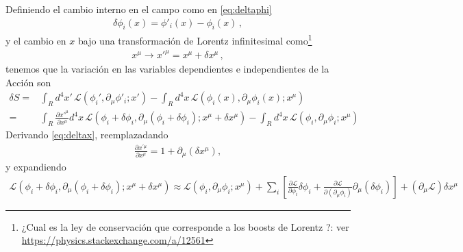 \begin{frame}
Definiendo el cambio interno en el campo como en \eqref{eq:deltaphi}
\begin{align}
  \delta\phi_i(x)=\phi'_i(x)-\phi_i(x)\,,
\end{align}
y el cambio en $x$ bajo una transformación de Lorentz infinitesimal como\footnote{¿Cual es la ley de conservación que corresponde a los boosts de Lorentz ?: ver \url{https://physics.stackexchange.com/a/12561}}
\begin{align}
\label{eq:deltax}
  x^\mu\to {x'}^\mu=x^\mu+\delta x^\mu\,,
\end{align}
tenemos que la variación en las variables dependientes e independientes de la Acción son
\begin{align}
   \delta S=&\int_{R}d^4x'\,\mathcal{L} \left( \phi_{i}',\partial_{\mu}\phi'_i;x' \right)- \int_{R}d^4x\,\mathcal{L} \left( \phi_{i}(x),\partial_{\mu}\phi_i(x);x^\mu \right) \nonumber\\
     =&\int_{R}\frac{\partial {x'}^\mu}{\partial x^\mu}d^4x\,\mathcal{L} \left( \phi_{i}+\delta\phi_i,\partial_{\mu}(\phi_i+\delta\phi_i);x^\mu+\delta x^\mu \right)- \int_{R}d^4x\,\mathcal{L} \left( \phi_{i},\partial_{\mu}\phi_i;x^\mu \right)\,
\end{align}
Derivando \eqref{eq:deltax},  reemplazadando
\begin{align}
  \frac{\partial x^{\prime \mu}}{\partial x^{\mu}}=1+\partial_{\mu} \left( \delta x^{\mu} \right),
\end{align}
y expandiendo
\begin{align}
  \mathcal{L} \left( \phi_{i}+\delta\phi_i,\partial_{\mu}(\phi_i+\delta\phi_i);x^\mu+\delta x^\mu \right) \approx
  \mathcal{L}(\phi_i,\partial_{\mu}\phi_i;x^\mu)+\sum_i \left[ \frac{\partial\mathcal{L}}{\partial\phi_i}\delta\phi_{i} +\frac{\partial\mathcal{L}}{\partial(\partial_{\mu}\phi_i)}\partial_{\mu}(\delta\phi_{i}) \right]+\left( \partial_{\mu}\mathcal{L} \right)\delta x^{\mu}
\end{align}


\end{frame}
